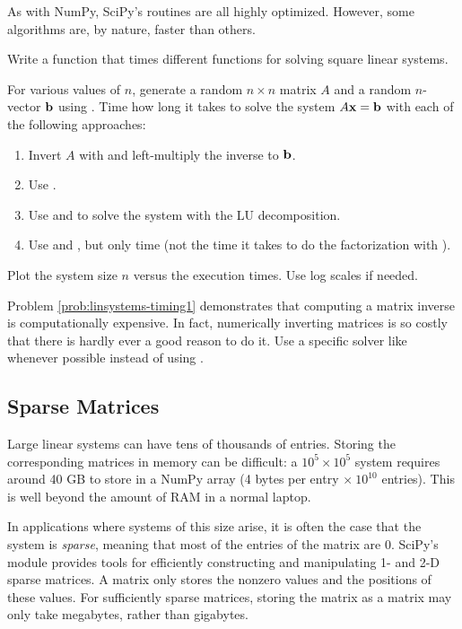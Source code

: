 As with NumPy, SciPy's routines are all highly optimized.
However, some algorithms are, by nature, faster than others.

\begin{problem} %
Write a function that times different  functions for solving square linear systems.

For various values of $n$, generate a random $n \times n$ matrix $A$ and a random $n$-vector $\mathbf{b}$ using .
Time how long it takes to solve the system $A\mathbf{x} = \mathbf{b}$ with each of the following approaches:
%
\begin{enumerate}
\item Invert $A$ with  and left-multiply the inverse to $\mathbf{b}$.
\item Use .
\item Use  and  to solve the system with the LU decomposition.
\item Use  and , but only time  (not the time it takes to do the factorization with ).
\end{enumerate}
%
Plot the system size $n$ versus the execution times.
Use log scales if needed.
\label{prob:linsystems-timing1}
\end{problem}

\begin{warn}
Problem \ref{prob:linsystems-timing1} demonstrates that computing a matrix inverse is computationally expensive.
In fact, numerically inverting matrices is so costly that there is hardly ever a good reason to do it.
Use a specific solver like  whenever possible instead of using .
\end{warn}

\subsection*{Sparse Matrices} %

Large linear systems can have tens of thousands of entries.
Storing the corresponding matrices in memory can be difficult: a $10^{5} \times 10^{5}$ system requires around 40 GB to store in a NumPy array (4 bytes per entry $\times\ 10^{10}$ entries).
This is well beyond the amount of RAM in a normal laptop.

In applications where systems of this size arise, it is often the case that the system is \emph{sparse}, meaning that most of the entries of the matrix are $0$.
SciPy's  module provides tools for efficiently constructing and manipulating 1- and 2-D sparse matrices.
A  matrix only stores the nonzero values and the positions of these values.
For sufficiently sparse matrices, storing the matrix as a  matrix may only take megabytes, rather than gigabytes.


